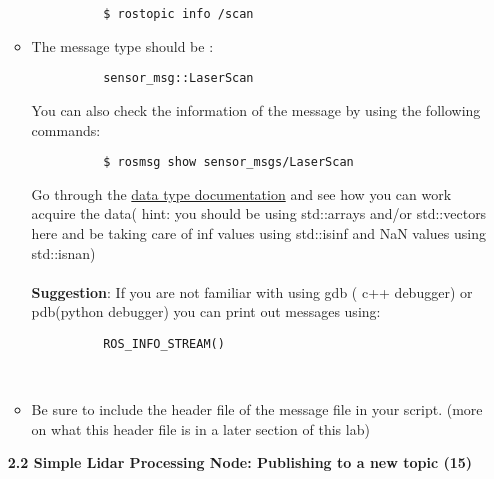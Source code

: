 \documentclass[letta4 paper]{article}
\begin{document}
\begin{enumerate}
\begin{itemize}
\begin{lstlisting}
          $ rostopic info /scan
        \end{lstlisting}{}
        \item The message type should be :
        \begin{lstlisting}
          sensor_msg::LaserScan
        \end{lstlisting}{}
        You can also check the information of the message by using the following commands: \\
        \begin{lstlisting}
          $ rosmsg show sensor_msgs/LaserScan
        \end{lstlisting}{}
        Go through the \href{http://docs.ros.org/melodic/api/sensor_msgs/html/msg/LaserScan.html}{data type documentation} and see how you can work acquire the data( hint: you should be using std::arrays and/or std::vectors here and be taking care of inf values using std::isinf and NaN values using std::isnan)\\
        \\
        \textbf{Suggestion}: If you are not familiar with using gdb ( c++ debugger) or pdb(python debugger) you can print out messages using:
        \begin{lstlisting}
          ROS_INFO_STREAM()
        \end{lstlisting}{}
        \\
        \item Be sure to include the header file of the message file in your script. (more on what this header file is in a later section of this lab) 
    \end{itemize}{}
    
    \textbf{2.2 Simple Lidar Processing Node: Publishing to a new topic (15)}\\
    

\end{enumerate}
\end{document}
